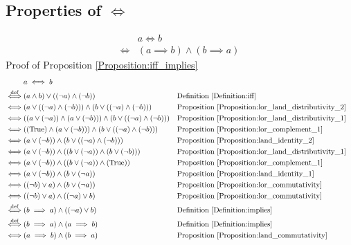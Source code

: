 \subsection{Properties of $\iff$}
\begin{prop}
\label{Proposition:iff_implies}
\begin{align*}
& a \iff b \\
\iff & (a \implies b) \land (b \implies a)
\end{align*}
Proof of Proposition \ref{Proposition:iff_implies}
\begin{align*}
& a \iff b \\
\overset{\operatorname{def}}{\iff} & (a \land b) \lor ((\lnot a) \land (\lnot b))
& & \text{Definition \ref{Definition:iff}} \\
\iff & (a \lor ((\lnot a) \land (\lnot b))) \land (b \lor ((\lnot a) \land (\lnot b)))
& & \text{Proposition \ref{Proposition:lor_land_distributivity_2}} \\
\iff & ((a \lor (\lnot a)) \land (a \lor (\lnot b))) \land (b \lor ((\lnot a) \land (\lnot b)))
& & \text{Proposition \ref{Proposition:lor_land_distributivity_1}} \\
\iff & ((\text{True}) \land (a \lor (\lnot b))) \land (b \lor ((\lnot a) \land (\lnot b)))
& & \text{Proposition \ref{Proposition:lor_complement_1}} \\
\iff & (a \lor (\lnot b)) \land (b \lor ((\lnot a) \land (\lnot b)))
& & \text{Proposition \ref{Proposition:land_identity_2}} \\
\iff & (a \lor (\lnot b)) \land ((b \lor (\lnot a)) \land (b \lor (\lnot b)))
& & \text{Proposition \ref{Proposition:lor_land_distributivity_1}} \\
\iff & (a \lor (\lnot b)) \land ((b \lor (\lnot a)) \land (\text{True}))
& & \text{Proposition \ref{Proposition:lor_complement_1}} \\
\iff & (a \lor (\lnot b)) \land (b \lor (\lnot a))
& & \text{Proposition \ref{Proposition:land_identity_1}} \\
\iff & ((\lnot b) \lor a) \land (b \lor (\lnot a))
& & \text{Proposition \ref{Proposition:lor_commutativity}} \\
\iff & ((\lnot b) \lor a) \land ((\lnot a) \lor b)
& & \text{Proposition \ref{Proposition:lor_commutativity}} \\
\overset{\operatorname{def}}{\iff} & (b \implies a) \land ((\lnot a) \lor b)
& & \text{Definition \ref{Definition:implies}} \\
\overset{\operatorname{def}}{\iff} & (b \implies a) \land (a \implies b)
& & \text{Definition \ref{Definition:implies}} \\
\iff & (a \implies b) \land (b \implies a)
& & \text{Proposition \ref{Proposition:land_commutativity}} \\
\end{align*}
\end{prop}

